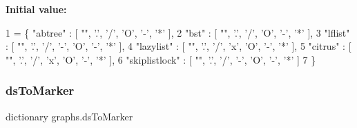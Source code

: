 {\bfseries Initial value\+:}
\begin{DoxyCode}
1 =  \{ \textcolor{stringliteral}{"abtree"} :         [ \textcolor{stringliteral}{""}, \textcolor{stringliteral}{'.'}, \textcolor{stringliteral}{'/'}, \textcolor{stringliteral}{'O'}, \textcolor{stringliteral}{'-'}, \textcolor{stringliteral}{'*'} ],
2                 \textcolor{stringliteral}{"bst"} :          [ \textcolor{stringliteral}{""}, \textcolor{stringliteral}{'.'}, \textcolor{stringliteral}{'/'}, \textcolor{stringliteral}{'O'}, \textcolor{stringliteral}{'-'}, \textcolor{stringliteral}{'*'} ],
3                 \textcolor{stringliteral}{"lflist"} :       [ \textcolor{stringliteral}{""}, \textcolor{stringliteral}{'.'}, \textcolor{stringliteral}{'/'}, \textcolor{stringliteral}{'-'}, \textcolor{stringliteral}{'O'}, \textcolor{stringliteral}{'-'}, \textcolor{stringliteral}{'*'} ],
4                 \textcolor{stringliteral}{"lazylist"} :     [ \textcolor{stringliteral}{""}, \textcolor{stringliteral}{'.'}, \textcolor{stringliteral}{'/'}, \textcolor{stringliteral}{'x'}, \textcolor{stringliteral}{'O'}, \textcolor{stringliteral}{'-'}, \textcolor{stringliteral}{'*'} ],
5                 \textcolor{stringliteral}{"citrus"} :       [ \textcolor{stringliteral}{""}, \textcolor{stringliteral}{'.'}, \textcolor{stringliteral}{'/'}, \textcolor{stringliteral}{'x'}, \textcolor{stringliteral}{'O'}, \textcolor{stringliteral}{'-'}, \textcolor{stringliteral}{'*'} ],
6                 \textcolor{stringliteral}{"skiplistlock"} : [ \textcolor{stringliteral}{""}, \textcolor{stringliteral}{'.'}, \textcolor{stringliteral}{'/'}, \textcolor{stringliteral}{'-'}, \textcolor{stringliteral}{'O'}, \textcolor{stringliteral}{'-'}, \textcolor{stringliteral}{'*'} ]
7             \}
\end{DoxyCode}
\mbox{\label{namespacegraphs_a5c42405aa985130781ea9cad937fdf53}} 
\subsubsection{\texorpdfstring{ds\+To\+Marker}{dsToMarker}}
{\footnotesize\ttfamily dictionary graphs.\+ds\+To\+Marker}

